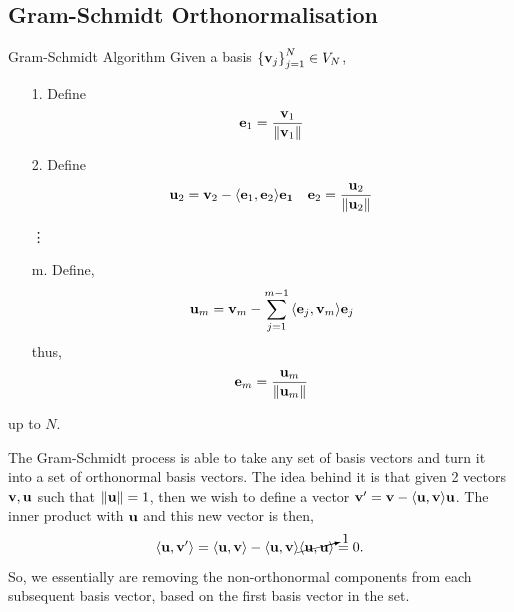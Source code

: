 \documentclass{book}
\def\innerproduct#1#2{{\langle #1},{#2 \rangle}}
\begin{document}
\subsection{Gram-Schmidt Orthonormalisation}
\begin{Definitions}{Gram-Schmidt Algorithm}{}
	Given a basis $\left\{\vb{v}_j\right\}_{j=1}^N \in V_N$,
	\begin{itemize}
		\item[1.] Define
		\begin{equation}
			\vb{e}_1 = \frac{\vb{v}_1}{\norm{\vb{v}_1}}
		\end{equation}
		\item[2.] Define 
		\begin{align}
			\vb{u}_2 = \vb{v}_2 - \innerproduct{\vb{e}_1}{\vb{e}_2}\vb{e_1}
	&&
			\vb{e}_2 = \frac{\vb{u}_2}{\norm{\vb{u}_2}}
		\end{align}
		\item[\vdots]
		\item[m.] Define,
		\begin{equation}
			\vb{u}_m = \vb{v}_m - \sum_{j=1}^{m-1}\innerproduct{\vb{e}_j}{\vb{v}_m}\vb{e}_j
		\end{equation}
		thus,
		\begin{equation}
			\vb{e}_m = \frac{\vb{u}_m}{\norm{\vb{u}_m}}
		\end{equation}
	\end{itemize}
	up to $N$.
\end{Definitions}
The Gram-Schmidt process is able to take any set of basis vectors and turn it into a set of orthonormal basis vectors. The idea behind it is that given 2 vectors $\vb{v},\vb{u}$ such that $\norm{\vb{u}} = 1$, then we wish to define a vector $\vb{v}' = \vb{v} - \innerproduct{\vb{u}}{\vb{v}}\vb{u}$. The inner product with $\vb{u}$ and this new vector is then,
\begin{equation}
	\innerproduct{\vb{u}}{\vb{v}'} = \innerproduct{\vb{u}}{\vb{v}} - \innerproduct{\vb{u}}{\vb{v}}\cancelto{1}{\innerproduct{\vb{u}}{\vb{u}}} = 0.
\end{equation}
So, we essentially are removing the non-orthonormal components from each subsequent basis vector, based on the first basis vector in the set.
\end{document}
